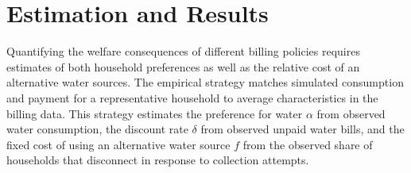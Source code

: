 \documentclass[12pt]{article}
\begin{document}






\section{Estimation and Results}\label{section:estimation}    %



Quantifying the welfare consequences of different billing policies requires estimates of both household preferences as well as the relative cost of an alternative water sources.  The empirical strategy matches simulated consumption and payment for a representative household to average characteristics in the billing data.  This strategy estimates the preference for water $\alpha$ from observed water consumption, the discount rate $\delta$ from observed unpaid water bills, and the fixed cost of using an alternative water source $f$ from the observed share of households that disconnect in response to collection attempts.  
\end{document}
